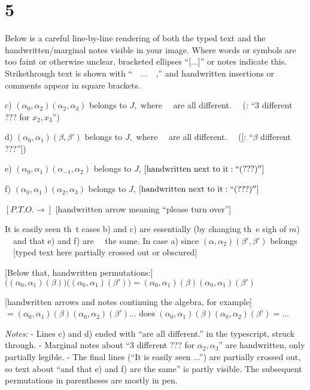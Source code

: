 \documentclass[12pt]{article}
\begin{document}
\section{5}

Below is a careful line-by-line rendering of both the typed text and the handwritten/marginal notes visible in your image.  
Where words or symbols are too faint or otherwise unclear, bracketed ellipses ``[...]'' or notes indicate this.  
Strikethrough text is shown with ``~~...~~,'' and handwritten insertions or comments appear in square brackets.

\bigskip

c) \((\alpha_0, \alpha_2)(\alpha_2, \alpha_3)\) belongs to \(J,\) where ~~are all different.~~ 
(:
  ``3 different ??? for $x_2, x_3$'')

d) \((\alpha_0, \alpha_1)(\beta, \beta')\) belongs to \(J,\) where ~~are all different.~~ 
([: ``$\beta$ different ???''])

e) \((\alpha_0, \alpha_1)(\alpha_{-1}, \alpha_2)\) belongs to \(J\), \([\text{handwritten next to it}: ``(???)'']\)

f) \((\alpha_0, \alpha_1)(\alpha_2, \alpha_3)\) belongs to \(J\), \([\text{handwritten next to it}: ``(???)'']\)

\bigskip

\([P.T.O. \rightarrow]\)   [handwritten arrow meaning ``please turn over'']

\bigskip

It is easily seen th\ t cases b) and c) are essentially
(by changing th\ e sigh of \(m\)) ~~and that e) and f) are~~ 
the same. In case a) since \((\alpha, \alpha_2)(\beta', \beta')\) belongs 
~~[typed text here partially crossed out or obscured]~~

\bigskip

[Below that, handwritten permutations:]
\(\bigl((\alpha_0, \alpha_1)(\beta)\bigr)\bigl((\alpha_0, \alpha_1)(\beta')\bigr) = (\alpha_0, \alpha_1)(\beta)(\alpha_0, \alpha_1)(\beta')\)

[handwritten arrows and notes continuing the algebra, for example]
\(= (\alpha_0, \alpha_1)(\beta)(\alpha_0, \alpha_2)(\beta') \ldots\)
\(\text{does } (\alpha_0, \alpha_1)(\beta)(\alpha_0, \alpha_2)(\beta') = \ldots\)

\bigskip

\textit{Notes:}
- Lines c) and d) ended with ``are all different.'' in the typescript, struck through.  
- Marginal notes about ``3 different ??? for \(\alpha_2, \alpha_3\)'' are handwritten, only partially legible.  
- The final lines (``It is easily seen ...'') are partially crossed out, so text about ``and that e) and f) are the same'' is partly visible.  The subsequent permutations in parentheses are mostly in pen.
\end{document}
